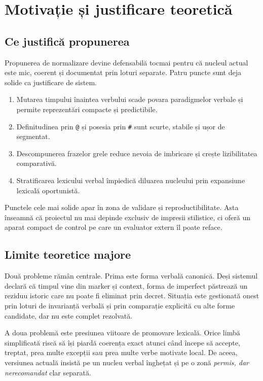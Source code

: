 \documentclass[12pt,onecolumn,letterpaper]{article}
\newcommand{\rs}[1]{\texttt{#1}}
\begin{document}
\section{Motivație și justificare teoretică}

\subsection{Ce justifică propunerea}

Propunerea de normalizare devine defensabilă tocmai pentru că nucleul actual
este mic, coerent și documentat prin loturi separate. Patru puncte sunt deja
solide ca justificare de sistem.

\begin{enumerate}[leftmargin=*]
\item Mutarea timpului înaintea verbului scade povara paradigmelor verbale și
permite reprezentări compacte și predictibile.
\item Definitudinea prin \rs{@} și posesia prin \rs{\#} sunt scurte, stabile și
ușor de segmentat.
\item Descompunerea frazelor grele reduce nevoia de imbricare și crește
lizibilitatea comparativă.
\item Stratificarea lexicului verbal împiedică diluarea nucleului prin expansiune
lexicală oportunistă.
\end{enumerate}

Punctele cele mai solide apar în zona de validare și reproductibilitate. Asta
înseamnă că proiectul nu mai depinde exclusiv de impresii stilistice, ci oferă
un aparat compact de control pe care un evaluator extern îl poate reface.

\subsection{Limite teoretice majore}

Două probleme rămân centrale. Prima este forma verbală canonică. Deși sistemul
declară că timpul vine din marker și context, forma de imperfect păstrează un
reziduu istoric care nu poate fi eliminat prin decret. Situația este gestionată
onest prin loturi de invarianță verbală și prin comparație explicită cu alte
forme candidate, dar nu este complet rezolvată.

A doua problemă este presiunea viitoare de promovare lexicală. Orice limbă
simplificată riscă să își piardă coerența exact atunci când începe să accepte,
treptat, prea multe excepții sau prea multe verbe motivate local. De aceea,
versiunea actuală insistă pe un nucleu verbal înghețat și pe o zonă \textit{permis,
dar nerecomandat} clar separată.
\end{document}
